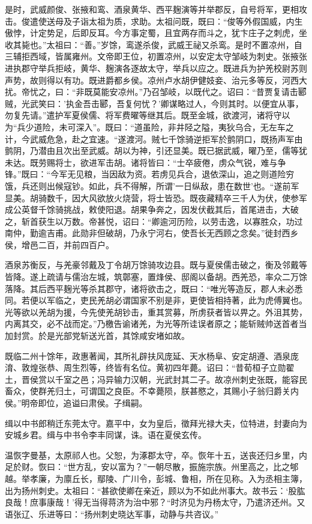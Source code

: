 \documentclass[12pt,UTF8]{ctexbook}
\begin{document}
是时，武威颜俊、张掖和鸾、酒泉黄华、西平麹演等并举郡反，自号将军，更相攻击。俊遣使送母及子诣太祖为质，求助。太祖问既，既曰：“俊等外假国威，内生傲悖，计定势足，后即反耳。今方事定蜀，且宜两存而斗之，犹卞庄子之刺虎，坐收其毙也。”太祖曰：“善。”岁馀，鸾遂杀俊，武威王祕又杀鸾。是时不置凉州，自三辅拒西域，皆属雍州。文帝即王位，初置凉州，以安定太守邹岐为刺史。张掖张进执郡守举兵拒岐，黄华、麹演各逐故太守，举兵以应之。既进兵为护羌校尉苏则声势，故则得以有功。既进爵都乡侯。凉州卢水胡伊健妓妾、治元多等反，河西大扰。帝忧之，曰：“非既莫能安凉州。”乃召邹岐，以既代之。诏曰：“昔贾复请击郾贼，光武笑曰：'执金吾击郾，吾复何忧？'卿谋略过人，今则其时。以便宜从事，勿复先请。”遣护军夏侯儒、将军费曜等继其后。既至金城，欲渡河，诸将守以为“兵少道险，未可深入”。既曰：“道虽险，非井陉之隘，夷狄乌合，无左车之计，今武威危急，赴之宜速。“遂渡河。贼七千馀骑逆拒军於鹯阴口，既扬声军由鹯阴，乃潜由且次出至武威。胡以为神，引还显美。既已据武威，曜乃至，儒等犹未达。既劳赐将士，欲进军击胡。诸将皆曰：“士卒疲倦，虏众气锐，难与争锋。”既曰：“今军无见粮，当因敌为资。若虏见兵合，退依深山，追之则道险穷饿，兵还则出候寇钞。如此，兵不得解，所谓'一日纵敌，患在数世'也。“遂前军显美。胡骑数千，因大风欲放火烧营，将士皆恐。既夜藏精卒三千人为伏，使参军成公英督千馀骑挑战，敕使阳退。胡果争奔之，因发伏截其后，首尾进击，大破之，斩首获生以万数。帝甚悦，诏曰：“卿逾河历险，以劳击逸，以寡胜众，功过南仲，勤逾吉甫。此勋非但破胡，乃永宁河右，使吾长无西顾之念矣。”徙封西乡侯，增邑二百，并前四百户。

酒泉苏衡反，与羌豪邻戴及丁令胡万馀骑攻边县。既与夏侯儒击破之，衡及邻戴等皆降。遂上疏请与儒治左城，筑鄣塞，置烽侯、邸阁以备胡。西羌恐，率众二万馀落降。其后西平麹光等杀其郡守，诸将欲击之，既曰：“唯光等造反，郡人未必悉同。若便以军临之，吏民羌胡必谓国家不别是非，更使皆相持著，此为虎傅翼也。光等欲以羌胡为援，今先使羌胡钞击，重其赏募，所虏获者皆以畀之。外沮其势，内离其交，必不战而定。”乃檄告谕诸羌，为光等所诖误者原之；能斩贼帅送首者当加封赏。於是光部党斩送光首，其馀咸安堵如故。

既临二州十馀年，政惠著闻，其所礼辟扶风庞延、天水杨阜、安定胡遵、酒泉庞淯、敦煌张恭、周生烈等，终皆有名位。黄初四年薨。诏曰：“昔荀桓子立勋翟土，晋侯赏以千室之邑；冯异输力汉朝，光武封其二子。故凉州刺史张既，能容民畜众，使群羌归土，可谓国之良臣。不幸薨陨，朕甚愍之，其赐小子翁归爵关内侯。”明帝即位，追谥曰肃侯。子缉嗣。

缉以中书郎稍迁东莞太守。嘉平中，女为皇后，徵拜光禄大夫，位特进，封妻向为安城乡君。缉与中书令李丰同谋，诛。语在夏侯玄传。

温恢字曼基，太原祁人也。父恕，为涿郡太守，卒。恢年十五，送丧还归乡里，内足於财。恢曰：“世方乱，安以富为？”一朝尽散，振施宗族。州里高之，比之郇越。举孝廉，为廪丘长，鄢陵、广川令，彭城、鲁相，所在见称。入为丞相主簿，出为扬州刺史。太祖曰：“甚欲使卿在亲近，顾以为不如此州事大。故书云：‘股肱良哉！庶事康哉！’得无当得蒋济为治中邪？“时济见为丹杨太守，乃遣济还州。又语张辽、乐进等曰：“扬州刺史晓达军事，动静与共咨议。”
\end{document}
